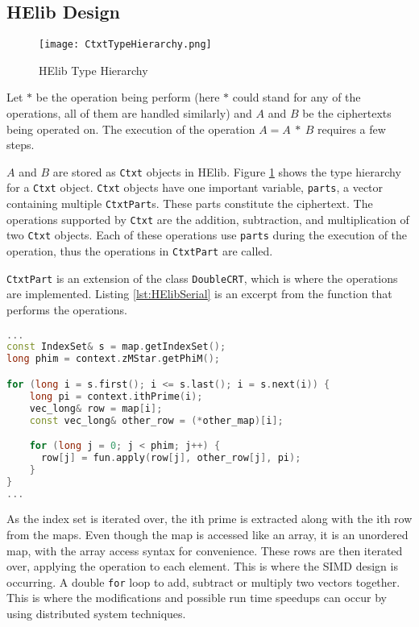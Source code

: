 \subsection{HElib Design} \label{sec:HElibSerialDesign}
\begin{figure}[htp]
\centering
\texttt{[image: CtxtTypeHierarchy.png]}
\caption{HElib Type Hierarchy}
\label{fig:CtxtTypeHierarchy}
\end{figure}

Let $\ast$ be the operation being perform (here $\ast$ could stand for any of the operations, all of them are handled similarly) and $A$ and $B$ be the ciphertexts being operated on. The execution of the operation $ A = A\ \ast\  B$ requires a few steps. 

$A$ and $B$ are stored as \verb|Ctxt| objects in HElib. Figure \ref{fig:CtxtTypeHierarchy} shows the type hierarchy for a \verb|Ctxt| object. \verb|Ctxt| objects have one important variable, \verb|parts|, a vector containing multiple \verb|CtxtPart|s. These parts constitute the ciphertext. The operations supported by \verb|Ctxt| are the addition, subtraction, and multiplication of two \verb|Ctxt| objects. Each of these operations use \verb|parts| during the execution of the operation, thus the operations in \verb|CtxtPart| are called.

\verb|CtxtPart| is an extension of the class \verb|DoubleCRT|, which is where the operations are implemented. Listing \ref{lst:HElibSerial} is an excerpt from the function that performs the operations.

\begin{lstlisting}[language=C++,caption={Add, Sub and Mul operations of two DoubleCRT objects},label={lst:HElibSerial}]
...
const IndexSet& s = map.getIndexSet();
long phim = context.zMStar.getPhiM();

for (long i = s.first(); i <= s.last(); i = s.next(i)) {
    long pi = context.ithPrime(i);
    vec_long& row = map[i];
    const vec_long& other_row = (*other_map)[i];

    for (long j = 0; j < phim; j++) {
      row[j] = fun.apply(row[j], other_row[j], pi);
    }
}
...
\end{lstlisting}

As the index set is iterated over, the ith prime is extracted along with the ith row from the maps. Even though the map is accessed like an array, it is an unordered map, with the array access syntax for convenience. These rows are then iterated over, applying the operation to each element. This is where the SIMD design is occurring. A double \verb|for| loop to add, subtract or multiply two vectors together. This is where the modifications and possible run time speedups can occur by using distributed system techniques.

